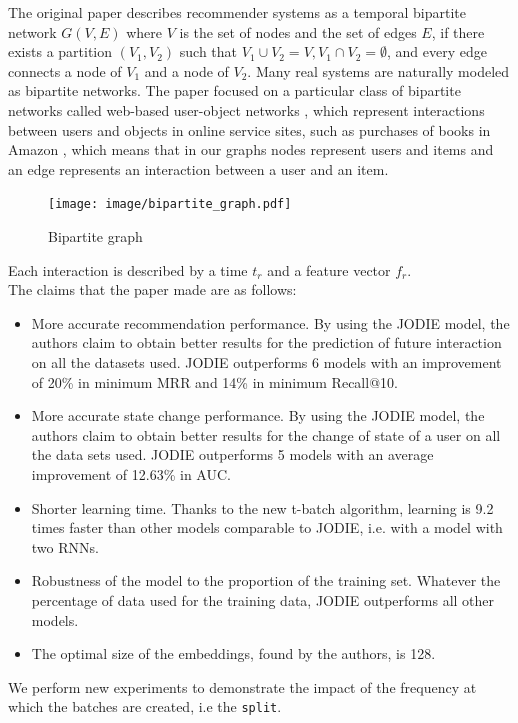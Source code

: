The original paper describes recommender systems as a temporal bipartite network { \color{blue} $G(V, E)$  where $V$ is the set of nodes and the set of edges $E$, if there exists a partition $\left(V_1, V_2\right)$ such that $V_1 \cup V_2=V, V_1 \cap V_2=\emptyset$, and every edge connects a node of $V_1$ and a node of $V_2$. Many real systems are naturally modeled as bipartite networks. The paper focused on a particular class of bipartite networks called web-based user-object networks \supercite{Shang_2010}, which represent interactions between users and objects in online service sites, such as purchases of books in Amazon \supercite{L__2012}, which means that in our graphs  nodes  represent users and items and an edge  represents an interaction between a user and an item.}

\begin{figure}[H]
    \centering
    \texttt{[image: image/bipartite\_graph.pdf]}
    \caption{Bipartite graph}
    \label{bipartite_graph}
\end{figure}
Each interaction is described by a time $t_r$ and a feature vector $f_r$.\\

The claims that the paper made are as follows:
\begin{itemize}
    \item More accurate recommendation performance. By using the JODIE model, the authors claim to obtain better results for the prediction of future interaction on all the datasets used. JODIE outperforms 6 models with an improvement of 20\% in minimum MRR and 14\% in minimum Recall@10.
    \item More accurate state change performance. By using the JODIE model, the authors claim to obtain better results for the change of state of a user on all the data sets used. JODIE outperforms 5 models with an average improvement of 12.63\% in AUC.
    \item Shorter learning time. Thanks to the new t-batch algorithm, learning is 9.2 times faster than other models comparable to JODIE, i.e. with a model with two RNNs.
    \item Robustness of the model to the proportion of the training set. Whatever the percentage of data used for the training data, JODIE outperforms all other models.
    \item The optimal size of the embeddings, found by the authors, is 128.
\end{itemize}

We perform new experiments to demonstrate the impact of the frequency at which the batches are created, i.e the \texttt{split}.
